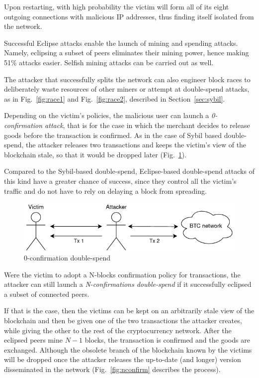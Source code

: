 \documentclass[12pt, letterpaper, twoside]{article}
\begin{document}
Upon restarting, with high probability the victim will form all of its eight outgoing connections with malicious IP addresses, thus finding itself isolated from the network.

Successful Eclipse attacks enable the launch of mining and spending attacks. Namely, eclipsing a subset of peers eliminates their mining power, hence making 51\% attacks easier. Selfish mining attacks can be carried out as well.

The attacker that successfully splits the network can also engineer block races to deliberately waste resources of other miners or attempt at double-spend attacks, as in Fig.~\ref{fig:race1} and Fig.~\ref{fig:race2}, described in Section~\ref{sec:sybil}.

Depending on the victim's policies, the malicious user can launch a \textit{0-confirmation attack}, that is for the case in which the merchant decides to release goods before the transaction is confirmed. As in the case of Sybil based double-spend, the attacker releases two transactions and keeps the victim's view of the blockchain stale, so that it would be dropped later (Fig.~\ref{fig:0confirm}).

Compared to the Sybil-based double-spend, Eclipse-based double-spend attacks of this kind have a greater chance of success, since they control all the victim's traffic and do not have to rely on delaying a block from spreading.

\begin{figure}[h!]
	\includegraphics[width=.7\textwidth]{pict/0confirm-doublespend.png}
	\centering
	\caption{0-confirmation double-spend}
	\label{fig:0confirm}
\end{figure}

Were the victim to adopt a N-blocks confirmation policy for transactions, the attacker can still launch a \textit{N-confirmations double-spend} if it successfully eclipsed a subset of connected peers.

If that is the case, then the victims can be kept on an arbitrarily stale view of the blockchain and then be given one of the two transactions the attacker creates, while giving the other to the rest of the cryptocurrency network. After the eclipsed peers mine $N - 1$ blocks, the transaction is confirmed and the goods are exchanged. Although the obsolete branch of the blockchain known by the victims will be dropped once the attacker releases the up-to-date (and longer) version disseminated in the network (Fig.~\ref{fig:nconfirm} describes the process).  
\end{document}
